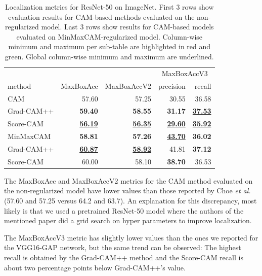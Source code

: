\begin{table}[h]
\centering
\begin{tabular}{lrrrr}
\toprule
 & & & \multicolumn{2}{c}{MaxBoxAccV3} \\
method & MaxBoxAcc & MaxBoxAccV2 & precision & recall \\
\cmidrule(lr){1-1} \cmidrule(lr){2-5}
CAM & 57.60 & 57.25 & 30.55 & 36.58 \\
Grad-CAM++ & \color{teal} \bfseries 59.40 & \color{teal} \bfseries 58.55 & \color{teal} \bfseries 31.17 & \color{teal} \bfseries \underline{37.53} \\
Score-CAM & \color{purple} \bfseries \underline{56.19} & \color{purple} \bfseries \underline{56.35} & \color{purple} \bfseries \underline{29.60} & \color{purple} \bfseries \underline{35.92} \\
\cmidrule(lr){1-1} \cmidrule(lr){2-5}
MinMaxCAM & \color{purple} \bfseries 58.81 & \color{purple} \bfseries 57.26 & \color{teal} \bfseries \underline{43.70} & \color{purple} \bfseries 36.02 \\
Grad-CAM++ & \color{teal} \bfseries \underline{60.87} & \color{teal} \bfseries \underline{58.92} & 41.81 & \color{teal} \bfseries 37.12 \\
Score-CAM & 60.00 & 58.10 & \color{purple} \bfseries 38.70 & 36.53 \\
\bottomrule
\end{tabular}
\caption[Localization metrics for ResNet-50 on ImageNet]{Localization metrics for ResNet-50 on ImageNet. First 3 rows show evaluation results for CAM-based methods evaluated on the non-regularized model. Last 3 rows show results for CAM-based models evaluated on MinMaxCAM-regularized model. Column-wise minimum and maximum per sub-table are highlighted in red and green. Global column-wise minimum and maximum are underlined.}
\label{tab:metrics_resnet50_imagenet}
\end{table}

The MaxBoxAcc and MaxBoxAccV2 metrics for the CAM method evaluated on the non-regularized model have lower values than those reported by Choe \textit{et al.} \cite{choe2020evaluating} (57.60 and 57.25 versus 64.2 and 63.7). An explanation for this discrepancy, most likely is that we used a pretrained ResNet-50 model where the authors of the mentioned paper did a grid search on hyper parameters to improve localization. 

The MaxBoxAccV3 metric has slightly lower values than the ones we reported for the VGG16-GAP network, but the same trend can be observed: The highest recall is obtained by the Grad-CAM++ method and the Score-CAM recall is about two percentage points below Grad-CAM++'s value. 

